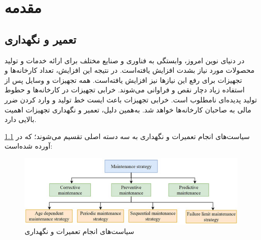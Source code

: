 \chapter{مقدمه}

\section{تعمیر و نگهداری}

در دنیای نوین امروز، وابستگی به فناوری و صنایع مختلف برای ارائه خدمات و تولید محصولات مورد نیاز بشدت افزایش یافته‌است. در نتیجه این افزایش، تعداد کارخانه‌ها و تجهیزات برای رفع این نیازها نیز افزایش یافته‌است. همه تجهیزات و وسایل پس از استفاده زیاد دچار نقص و فراوانی می‌شوند. خرابی تجهیزات در کارخانه‌ها و حطوط تولید پدیده‌ای نامطلوب است. خرابی تجهیزات باعث ایست خط تولید و وارد کردن ضرر مالی به صاحبان کارخانه‌ها خواهد شد. به‌همین دلیل، تعمیر و نگهداری تجهیزات اهمیت بالایی دارد. 

سیاست‌های انجام تعمیرات و نگهداری به سه دسته اصلی تقسیم می‌شوند؛ که در \cref{MS} آورده شده‌است:

\begin{figure}[!h]
\centering\includegraphics[scale=1]{maintenance_strategy.png}
\caption{سیاست‌های انجام تعمیرات و نگهداری\cite{zhao2022review}}\label{MS}
\end{figure}

